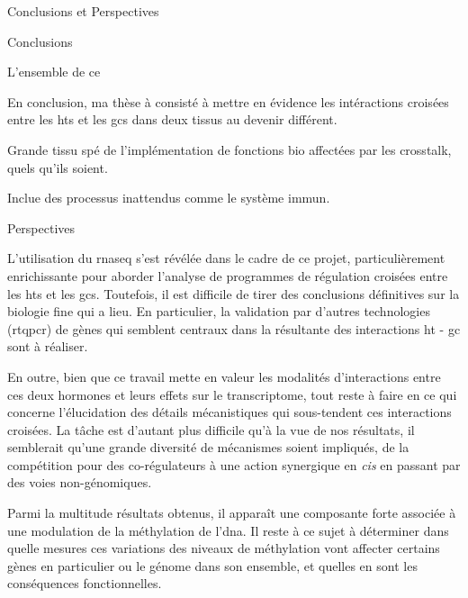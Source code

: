 \documentclass[../main.tex]{subfiles}
\begin{document}
\begin{chapter}{Conclusions et Perspectives}


\begin{section}{Conclusions}

L'ensemble de ce 

En conclusion, ma thèse à consisté à mettre en évidence les intéractions croisées entre les \glspl{ht} et les \glspl{gc} dans deux tissus au devenir différent.

Grande tissu spé de l'implémentation de fonctions bio affectées par les crosstalk, quels qu'ils soient.

Inclue des processus inattendus comme le système immun.

\end{section}


\begin{section}{Perspectives}

L'utilisation du \gls{rnaseq} s'est révélée dans le cadre de ce projet, particulièrement enrichissante pour aborder l'analyse de programmes de régulation croisées entre les \glspl{ht} et les \glspl{gc}.
Toutefois, il est difficile de tirer des conclusions définitives sur la biologie fine qui a lieu.
En particulier, la validation par d'autres technologies (\gls{rtqpcr}) de gènes qui semblent centraux dans la résultante des interactions \gls{ht} - \gls{gc} sont à réaliser.
\par
En outre, bien que ce travail mette en valeur les modalités d'interactions entre ces deux hormones et leurs effets sur le transcriptome, tout reste à faire en ce qui concerne l'élucidation des détails mécanistiques qui sous-tendent ces interactions croisées.
La tâche est d'autant plus difficile qu'à la vue de nos résultats, il semblerait qu'une grande diversité de mécanismes soient impliqués, de la compétition pour des co-régulateurs à une action synergique en \textit{cis} en passant par des voies non-génomiques.
\par
Parmi la multitude résultats obtenus, il apparaît une composante forte associée à une modulation de la méthylation de l'\gls{dna}.
Il reste à ce sujet à déterminer dans quelle mesures ces variations des niveaux de méthylation vont affecter certains gènes en particulier ou le génome dans son ensemble, et quelles en sont les conséquences fonctionnelles.



\end{section}

\end{chapter}
\end{document}
